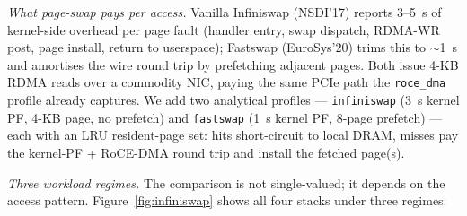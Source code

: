 \documentclass[10pt,twocolumn]{article}
\begin{document}
\emph{What page-swap pays per access.}
Vanilla Infiniswap (NSDI'17) reports 3--5~\textmu s of kernel-side
overhead per page fault (handler entry, swap dispatch, RDMA-WR
post, page install, return to userspace); Fastswap (EuroSys'20)
trims this to ${\sim}$1~\textmu s and amortises the wire round trip
by prefetching adjacent pages. Both issue 4-KB RDMA reads over a
commodity NIC, paying the same PCIe path the \texttt{roce\_dma}
profile already captures. We add two analytical profiles ---
\texttt{infiniswap} (3~\textmu s kernel PF, 4-KB page, no prefetch)
and \texttt{fastswap} (1~\textmu s kernel PF, 8-page prefetch) ---
each with an LRU resident-page set: hits short-circuit to local
DRAM, misses pay the kernel-PF + RoCE-DMA round trip and install
the fetched page(s).

\emph{Three workload regimes.}
The comparison is not single-valued; it depends on the access
pattern. Figure~\ref{fig:infiniswap} shows all four stacks under
three regimes:
\end{document}
